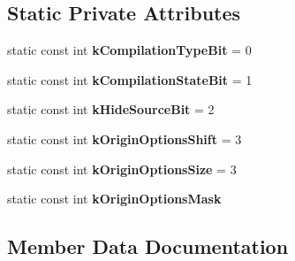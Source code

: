 \subsection*{Static Private Attributes}
\begin{DoxyCompactItemize}
\item 
static const int {\bfseries k\+Compilation\+Type\+Bit} = 0\hypertarget{classv8_1_1internal_1_1_script_a1aef20ee609266f0965fbc13bdaf1bed}{}\label{classv8_1_1internal_1_1_script_a1aef20ee609266f0965fbc13bdaf1bed}

\item 
static const int {\bfseries k\+Compilation\+State\+Bit} = 1\hypertarget{classv8_1_1internal_1_1_script_aeb07397e147ff31acf83ce4bd967455c}{}\label{classv8_1_1internal_1_1_script_aeb07397e147ff31acf83ce4bd967455c}

\item 
static const int {\bfseries k\+Hide\+Source\+Bit} = 2\hypertarget{classv8_1_1internal_1_1_script_ac9283445005b0f7d9783065153756288}{}\label{classv8_1_1internal_1_1_script_ac9283445005b0f7d9783065153756288}

\item 
static const int {\bfseries k\+Origin\+Options\+Shift} = 3\hypertarget{classv8_1_1internal_1_1_script_a341aff8bccf8c1e729acd01f7ac9fcc0}{}\label{classv8_1_1internal_1_1_script_a341aff8bccf8c1e729acd01f7ac9fcc0}

\item 
static const int {\bfseries k\+Origin\+Options\+Size} = 3\hypertarget{classv8_1_1internal_1_1_script_ab804eba06a610c5e1b2d89f7d1f6f12e}{}\label{classv8_1_1internal_1_1_script_ab804eba06a610c5e1b2d89f7d1f6f12e}

\item 
static const int {\bfseries k\+Origin\+Options\+Mask}
\end{DoxyCompactItemize}


\subsection{Member Data Documentation}
